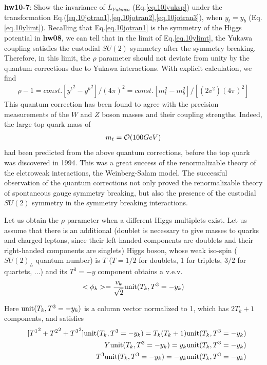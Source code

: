 \documentclass[12pt]{article}
\begin{document}
{\bf hw10-7}: Show the invariance of $L_{Yukawa}$ (Eq.\ref{eq.10lyuksp}) under the transformation Eq.(\ref{eq.10jotran1},\ref{eq.10jotran2},\ref{eq.10jotran3}), when $y_t = y_b$ (Eq.\ref{eq.10ylimt}).
Recalling that Eq.\ref{eq.10jotran1} is the symmetry of the Higgs potential 
in {\bf hw08}, we can tell that in the limit of Eq.\ref{eq.10ylimt}, the Yukawa coupling
satisfies the custodial $SU(2)$ symmetry after the symmetry breaking.
Therefore, in this limit, the $\rho$ parameter should not deviate from
unity by the quantum corrections due to Yukawa interactions. With
explicit calculation, we find
\begin{eqnarray}
  \rho - 1 = const. [{y^t}^2 - {y^b}^2]/(4\pi)^2
               = const. [m_t^2 - m_b^2]/[(2v^2)(4\pi)^2]
\end{eqnarray}
  This quantum correction has been found to agree with the precision
  measurements of the $W$ and $Z$ boson masses and their coupling strengths.
  Indeed, the large top quark mass of
\begin{eqnarray}
  m_t = {\cal O}(100GeV)
\end{eqnarray}
   had been predicted from the above quantum corrections, before the top
  quark was discovered in 1994. This was a great success of the
  renormalizable theory of the elctroweak interactions, the Weinberg-Salam
  model.  The successful observation of the quantum corrections not only
  proved the renormalizable theory of spontaneous gauge symmetry breaking,
  but also the presence of the custodial $SU(2)$ symmetry in the symmetry
  breaking interactions.


  Let us obtain the $\rho$ parameter when a different Higgs multiplets
  exist.  Let us assume that there is an additional (doublet is necessary
  to give masses to quarks and charged leptons, since their left-handed
  components are doublets and their right-handed components are singlets)
  Higgs boson, whose weak iso-spin ($SU(2)_L$ quantum number) is
  $T$ ($T=1/2$ for doublets, 1 for triplets, $3/2$ for quartets,
  ...) and its $T^3=-y$ component obtains a v.e.v.
\begin{eqnarray}
  <\phi_k> = \frac{v_k}{\sqrt{2}} {\rm unit}(T_k,T^3=-y_k)
\end{eqnarray}
  
  Here ${\rm unit}(T_k,T^3=-y_k)$ is a column vector normalized to 1, which has
  $2T_k+1$ components, and satisfies
\begin{eqnarray}
  &&[{T^1}^2 + {T^2}^2 + {T^3}^2]            {\rm unit}(T_k,T^3=-y_k)                      = T_k (T_k + 1) {\rm unit}(T_k,T^3=-y_k) \\
  &&Y   {\rm unit}(T_k,T^3=-y_k) =           y_k {\rm unit}(T_k,T^3=-y_k) \\
   &&T^3 {\rm unit}(T_k,T^3=-y_k) =          -y_k {\rm unit}(T_k,T^3=-y_k)
\end{eqnarray}
  
\end{document}
